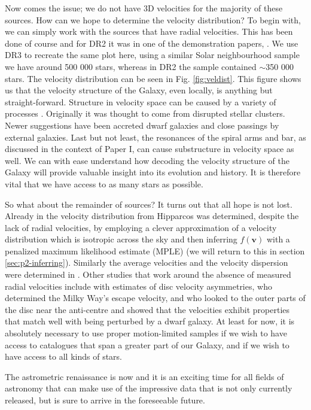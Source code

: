 Now comes the issue; we do not have 3D velocities for the majority of these sources. How can we hope to determine the velocity distribution? To begin with, we can simply work with the sources that have radial velocities. This has been done of course and for DR2 it was in one of the demonstration papers, \citep{dr2:kinematics}. We use DR3 to recreate the same plot here, using a similar Solar neighbourhood sample we have around 500 000 stars, whereas in DR2 the sample contained {$\sim$}350 000 stars. The velocity distribution can be seen in Fig. \ref{fig:veldist}. This figure shows us that the velocity structure of the Galaxy, even locally, is anything but straight-forward. Structure in velocity space can be caused by a variety of processes \citep[see, e.g.,][]{antoja:10a}. Originally it was thought to come from disrupted stellar clusters. Newer suggestions have been accreted dwarf galaxies and close passings by external galaxies. Last but not least, the resonances of the spiral arms and bar, as discussed in the context of Paper I, can cause substructure in velocity space as well. We can with ease understand how decoding the velocity structure of the Galaxy will provide valuable insight into its evolution and history. It is therefore vital that we have access to as many stars as possible.

So what about the remainder of sources? It turns out that all hope is not lost. Already in \cite{dehnen:98a} the velocity distribution from Hipparcos was determined, despite the lack of radial velocities, by employing a clever approximation of a velocity distribution which is isotropic across the sky and then inferring $f(\bm{v})$ with a penalized maximum likelihood estimate (MPLE) (we will return to this in section \ref{sec:p2-inferring}). Similarly the average velocities and the velocity dispersion were determined in \cite{dehnen:98b}. Other studies that work around the absence of measured radial velocities include \cite{antoja:17} with estimates of disc velocity asymmetries, \cite{koppelman:21} who determined the Milky Way's escape velocity, and \cite{mcmillan:22} who looked to the outer parts of the disc near the anti-centre and showed that the velocities exhibit properties that match well with being perturbed by a dwarf galaxy. At least for now, it is absolutely necessary to use proper motion-limited samples if we wish to have access to catalogues that span a greater part of our Galaxy, and if we wish to have access to all kinds of stars. 

The astrometric renaissance is now and it is an exciting time for all fields of astronomy that can make use of the impressive data that is not only currently released, but is sure to arrive in the foreseeable future.
